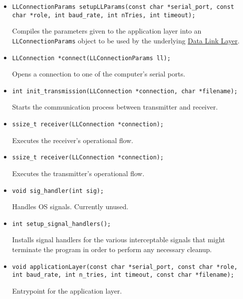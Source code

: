\documentclass[11pt,a4paper]{article}
\begin{document}
\begin{itemize}
    \item \begin{lstlisting}
LLConnectionParams setupLLParams(const char *serial_port, const char *role, int baud_rate, int nTries, int timeout);
    \end{lstlisting}

    Compiles the parameters given to the application layer into an \lstinline{LLConnectionParams} object to be used by the underlying \hyperref[sec:dll]{Data Link Layer}.

    \item \begin{lstlisting}
LLConnection *connect(LLConnectionParams ll);
    \end{lstlisting}

    Opens a connection to one of the computer's serial ports.

    \item \begin{lstlisting}
int init_transmission(LLConnection *connection, char *filename);
    \end{lstlisting}

    Starts the communication process between transmitter and receiver.

    \item \begin{lstlisting}
ssize_t receiver(LLConnection *connection);
    \end{lstlisting}

    Executes the receiver's operational flow.

    \item \begin{lstlisting}
ssize_t receiver(LLConnection *connection);
    \end{lstlisting}
        
    Executes the transmitter's operational flow.

    \item \begin{lstlisting}
void sig_handler(int sig);
    \end{lstlisting}

    Handles OS signals. Currently unused.

    \item \begin{lstlisting}
int setup_signal_handlers();
    \end{lstlisting}

    Installs signal handlers for the various interceptable signals that might terminate the program in order to perform any necessary cleanup.

    \item \begin{lstlisting}
void applicationLayer(const char *serial_port, const char *role, int baud_rate, int n_tries, int timeout, const char *filename);
    \end{lstlisting}

    Entrypoint for the application layer.

\end{itemize}
\end{document}
